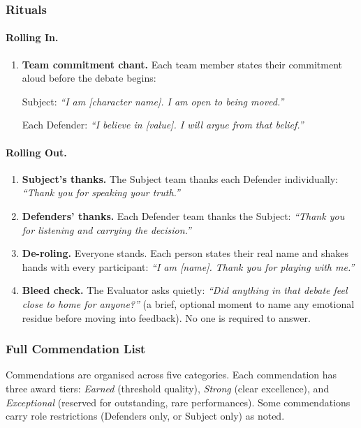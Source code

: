 \subsubsection{Rituals}

\paragraph{Rolling In.}
\begin{enumerate}
    \item \textbf{Team commitment chant.} Each team member states their commitment aloud before the debate begins:

    Subject: \textit{``I am [character name]. I am open to being moved.''}

    Each Defender: \textit{``I believe in [value]. I will argue from that belief.''}
\end{enumerate}

\paragraph{Rolling Out.}
\begin{enumerate}
    \item \textbf{Subject's thanks.} The Subject team thanks each Defender individually: \textit{``Thank you for speaking your truth.''}
    \item \textbf{Defenders' thanks.} Each Defender team thanks the Subject: \textit{``Thank you for listening and carrying the decision.''}
    \item \textbf{De-roling.} Everyone stands. Each person states their real name and shakes hands with every participant: \textit{``I am [name]. Thank you for playing with me.''}
    \item \textbf{Bleed check.} The Evaluator asks quietly: \textit{``Did anything in that debate feel close to home for anyone?''} (a brief, optional moment to name any emotional residue before moving into feedback). No one is required to answer.
\end{enumerate}

\subsubsection{Full Commendation List}

Commendations are organised across five categories. Each commendation has three award tiers: \textit{Earned} (threshold quality), \textit{Strong} (clear excellence), and \textit{Exceptional} (reserved for outstanding, rare performances). Some commendations carry role restrictions (Defenders only, or Subject only) as noted.

